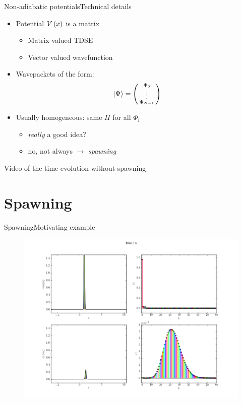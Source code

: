 \documentclass{beamer}
\begin{document}
\begin{frame}{Non-adiabatic potentials}{Technical details}
  \begin{itemize}
    \item Potential $V\left( x \right)$ is a matrix
    \begin{itemize}
      \item Matrix valued TDSE
      \item Vector valued wavefunction
    \end{itemize}
    \item Wavepackets of the form:
    \begin{equation*}
      \Ket{\Psi} = \left(\begin{smallmatrix} \Phi_0 \\ \vdots \\ \Phi_{N-1} \end{smallmatrix} \right)
    \end{equation*}
    \item Usually homogeneous: same $\Pi$ for all $\Phi_i$
    \begin{itemize}
      \item \emph{really} a good idea?
      \item no, not always $\rightarrow$ \emph{spawning}
    \end{itemize}
  \end{itemize}
  \begin{center}
    Video of the time evolution without spawning
  \end{center}
\end{frame}


\section{Spawning}


\begin{frame}{Spawning}{Motivating example}
  \begin{figure}
    \centering
    \includegraphics[width=0.8\linewidth]{./fig/spawn_motivation.png}
  \end{figure}
\end{frame}
\end{document}
